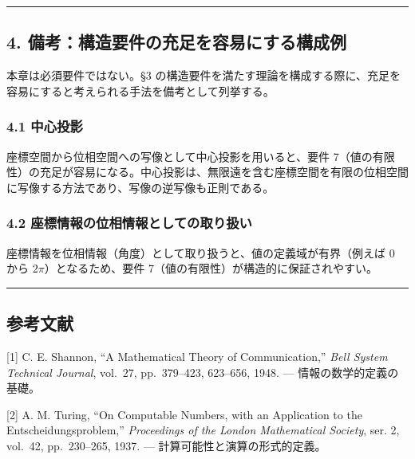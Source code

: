 \documentclass[a4paper,11pt]{ltjsarticle}
\begin{document}
\begin{center}\rule{0.5\linewidth}{0.5pt}\end{center}

\subsection{4.
備考：構造要件の充足を容易にする構成例}\label{ux5099ux8003ux69cbux9020ux8981ux4ef6ux306eux5145ux8db3ux3092ux5bb9ux6613ux306bux3059ux308bux69cbux6210ux4f8b}

本章は必須要件ではない。§3
の構造要件を満たす理論を構成する際に、充足を容易にすると考えられる手法を備考として列挙する。

\subsubsection{4.1 中心投影}\label{ux4e2dux5fc3ux6295ux5f71}

座標空間から位相空間への写像として中心投影を用いると、要件
7（値の有限性）の充足が容易になる。中心投影は、無限遠を含む座標空間を有限の位相空間に写像する方法であり、写像の逆写像も正則である。

\subsubsection{4.2
座標情報の位相情報としての取り扱い}\label{ux5ea7ux6a19ux60c5ux5831ux306eux4f4dux76f8ux60c5ux5831ux3068ux3057ux3066ux306eux53d6ux308aux6271ux3044}

座標情報を位相情報（角度）として取り扱うと、値の定義域が有界（例えば
\(0\) から \(2\pi\)）となるため、要件
7（値の有限性）が構造的に保証されやすい。

\begin{center}\rule{0.5\linewidth}{0.5pt}\end{center}

\subsection{参考文献}\label{ux53c2ux8003ux6587ux732e}

{[}1{]} C. E. Shannon, ``A Mathematical Theory of Communication,''
\emph{Bell System Technical Journal}, vol.~27, pp.~379--423, 623--656,
1948. --- 情報の数学的定義の基礎。

{[}2{]} A. M. Turing, ``On Computable Numbers, with an Application to
the Entscheidungsproblem,'' \emph{Proceedings of the London Mathematical
Society}, ser. 2, vol.~42, pp.~230--265, 1937. ---
計算可能性と演算の形式的定義。
\end{document}
